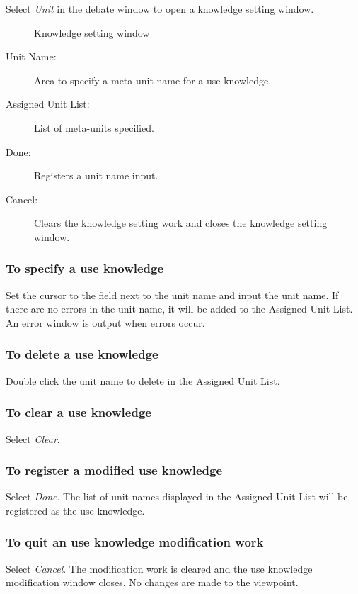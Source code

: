 Select {\sl Unit} in the debate window to open a knowledge setting window.

\begin{figure}[htb]
\begin{center}
\end{center}
\caption{Knowledge setting window}\label{Knowledge setting window}
\end{figure}

\begin{description}
\item[Unit Name:] Area to specify a meta-unit name for a use knowledge.
\item[Assigned Unit List:] List of meta-units specified.
\item[Done:] Registers a unit name input.
\item[Cancel:] Clears the knowledge setting work and closes the knowledge setting window.
\end{description}

\subsubsection{To specify a use knowledge}
Set the cursor to the field next to the unit name and input the unit name.
If there are no errors in the unit name, it will be added to the Assigned Unit List.
An error window is output when errors occur.

\subsubsection{To delete a use knowledge}
Double click the unit name to delete in the Assigned Unit List.
\subsubsection{To clear a use knowledge}
Select {\sl Clear}.

\subsubsection{To register a modified use knowledge}
Select {\sl Done}.
The list of unit names displayed in the Assigned Unit List will be registered as the use knowledge.

\subsubsection{To quit an use knowledge modification work} 
Select {\sl Cancel}.
The modification work is cleared and the use knowledge modification window closes. 
No changes are made to the viewpoint.

